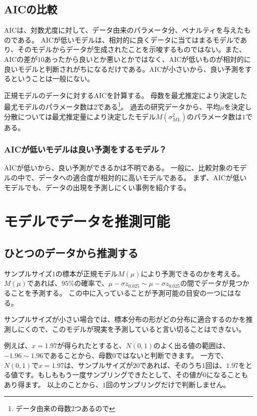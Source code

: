 \subsection{AICの比較}
AICは、対数尤度に対して、データ由来のパラメータ分、ペナルティを与えたものである。
AICが低いモデルは、相対的に良くデータに当てはまるモデルであり、そのモデルからデータが生成されたことを示唆するものではない。また、AICの差が$10$あったから良いとか悪いとかではなく、AICが低いものが相対的に良いモデルと判断されがちになるだけである。AICが小さいから、良い予測をするということは一般にない。

正規モデルのデータに対するAICを計算する。
母数を最尤推定により決定した最尤モデルのパラメータ数は2である\footnote{データ由来の母数2つあるので}。
過去の研究データから、平均$\mu$を決定し分散については最尤推定量により決定したモデル$M(\sigma^2_{ML})$のパラメータ数は$1$である。

\subsubsection{AICが低いモデルは良い予測をするモデル？}
AICが低いから、良い予測ができるかは不明である。
一般に、比較対象のモデルの中で、データへの適合度が相対的に高いモデルである。
まず、AICが低いモデルでも、データの出現を予測しにくい事例を紹介する。





\section{モデルでデータを推測可能}
\subsection{ひとつのデータから推測する}
サンプルサイズ$1$の標本が正規モデル$M(\mu)$により予測できるのかを考える。
$M(\mu)$であれば、$95\%$の確率で、$\mu-\sigma z_{0.025}\sim \mu-\sigma z_{0.025}$の間でデータが見つかることを予測する。
この中に入っていることが予測可能の目安の一つにはなる。

サンプルサイズが小さい場合では、標本分布の形がどの分布に適合するのかを推測しにくので、このモデルが現実を予測していると言い切ることはできない。



例えば、$x=1.97$が得られたとすると、$N(0,1)$のよく出る値の範囲は、$-1.96\sim1.96$であることから、母数$0$ではないと判断できます。
一方で、$N(0,1)$で$x=1.97$は、サンプルサイズが$20$であれば、そのうち$1$回は、$1.97$をとる値です。もしももう一度サンプリングできたとして、その値が$0$になることもあり得ます。
以上のことから、$1$回のサンプリングだけで判断しません。
\fi


